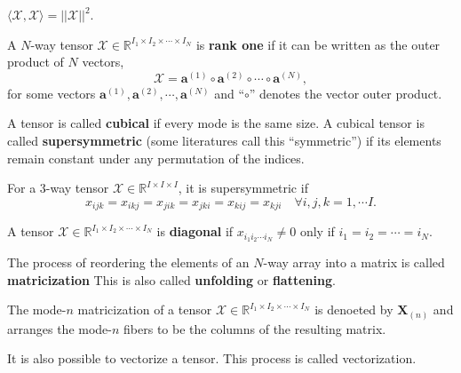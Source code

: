 \documentclass[preprint]{elsarticle}
\begin{document}
$\langle\boldsymbol{\mathscr{X}},\boldsymbol{\mathscr{X}}\rangle=||\boldsymbol{\mathscr{X}}||^2$.
\begin{defn}
    A $N$-way tensor $\boldsymbol{\mathscr{X}}\in\mathbb{R}^{I_1\times I_2\times\cdots\times I_N}$ is \textbf{rank one} if it can
    be written as the outer product of $N$ vectors,
    \begin{equation}
        \boldsymbol{\mathscr{X}} = \mathbf{a}^{(1)}\circ\mathbf{a}^{(2)}\circ\cdots\circ\mathbf{a}^{(N)},
    \end{equation}
    for some vectors $\mathbf{a}^{(1)},\mathbf{a}^{(2)},\cdots,\mathbf{a}^{(N)}$ and ``$\circ$'' denotes the vector outer product.
\end{defn}
\begin{defn}
    A tensor is called \textbf{cubical} if every mode is the same size. A cubical tensor is called \textbf{supersymmetric}
    (some literatures call this ``symmetric'') if its elements remain constant under any permutation of the indices.
\end{defn}
For a $3$-way tensor $\boldsymbol{\mathscr{X}}\in\mathbb{R}^{I\times I\times I}$, it is supersymmetric if
\[
    x_{ijk} = x_{ikj} = x_{jik} = x_{jki} = x_{kij} = x_{kji} \quad \forall i,j,k=1,\cdots I.
\]
\begin{defn}
    A tensor $\boldsymbol{\mathscr{X}}\in\mathbb{R}^{I_1\times I_2\times\cdots\times I_N}$ is \textbf{diagonal}
    if $x_{i_1i_2\cdots i_N}\neq 0$ only if $i_1=i_2=\cdots=i_N$. 
\end{defn}
\begin{defn}[Matricization]
    The process of reordering the elements of an $N$-way array into a matrix is called \textbf{matricization}
This is also called \textbf{unfolding} or \textbf{flattening}.
\end{defn}
The mode-$n$ matricization of a tensor $\boldsymbol{\mathscr{X}}\in\mathbb{R}^{I_1\times I_2\times\cdots\times I_N}$
is denoeted by $\mathbf{X}_{(n)}$ and arranges the mode-$n$ fibers to be the columns of the resulting matrix.
\begin{rmk}
    It is also possible to vectorize a tensor. This process is called vectorization.
\end{rmk}
\end{document}
